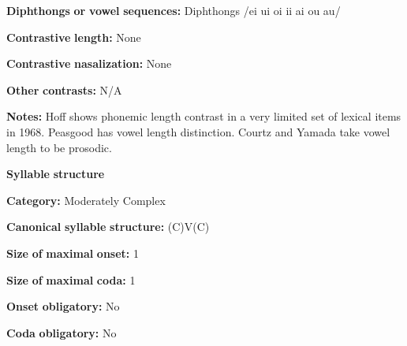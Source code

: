 \documentclass[output=paper]{langsci/langscibook}
\begin{document}
\begin{styleBody}
\textbf{Diphthongs} \textbf{or} \textbf{vowel} \textbf{sequences:} Diphthongs /ei ui oi ii ai ou au/
\end{styleBody}

\begin{styleBody}
\textbf{Contrastive} \textbf{length:} None
\end{styleBody}

\begin{styleBody}
\textbf{Contrastive} \textbf{nasalization:} None
\end{styleBody}

\begin{styleBody}
\textbf{Other} \textbf{contrasts:} N/A
\end{styleBody}

\begin{styleBody}
\textbf{Notes:} Hoff shows phonemic length contrast in a very limited set of lexical items in 1968. Peasgood has vowel length distinction. Courtz and Yamada take vowel length to be prosodic.
\end{styleBody}

\begin{styleBody}
\textbf{Syllable} \textbf{structure}
\end{styleBody}

\begin{styleBody}
\textbf{Category:} Moderately Complex
\end{styleBody}

\begin{styleBody}
\textbf{Canonical} \textbf{syllable} \textbf{structure:} (C)V(C) \citep[22-7]{Courtz2008}
\end{styleBody}

\begin{styleBody}
\textbf{Size} \textbf{of} \textbf{maximal} \textbf{onset:} 1
\end{styleBody}

\begin{styleBody}
\textbf{Size} \textbf{of} \textbf{maximal} \textbf{coda:} 1
\end{styleBody}

\begin{styleBody}
\textbf{Onset} \textbf{obligatory:} No
\end{styleBody}

\begin{styleBody}
\textbf{Coda} \textbf{obligatory:} No
\end{styleBody}
\end{document}
